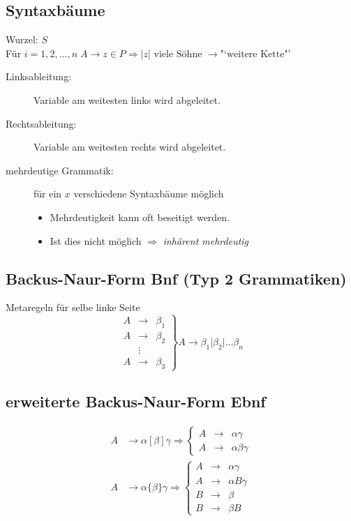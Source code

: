 \documentclass{scrartcl}
\begin{document}
\subsection*{Syntaxbäume}
Wurzel: $S$ \\
Für $i=1,2,\ldots,n\; A\to z\in P\Rightarrow\vert z\vert\textrm{ viele Söhne }\to \textrm{"`weitere Kette"'}$\\
\begin{description}
\item[Linksableitung:] Variable am weitesten links wird abgeleitet.
\item[Rechtsableitung:] Variable am weitesten rechts wird abgeleitet.
\item[mehrdeutige Grammatik:] für ein $x$ verschiedene Syntaxbäume möglich
	\begin{itemize}
	\item Mehrdeutigkeit kann oft beseitigt werden.
	\item Ist dies nicht möglich $\Rightarrow$ \emph{inhärent mehrdeutig}
	\end{itemize}
\end{description}

\subsection*{Backus-Naur-Form Bnf (Typ 2 Grammatiken)}
Metaregeln für selbe linke Seite
\[
\left. \begin{array}{ccc}
A & \to    & \beta_1 \\
A & \to    & \beta_2 \\
  & \vdots &         \\
A & \to    & \beta_3
\end{array} \right\rbrace A\to\beta_1\vert\beta_2\vert\ldots\beta_n
\]

\subsection*{erweiterte Backus-Naur-Form Ebnf}
\begin{align*}
A &\to \alpha[\beta]\gamma \Rightarrow \left\lbrace
\begin{array}{ccc}
A & \to & \alpha\gamma \\
A & \to & \alpha\beta\gamma
\end{array}
\right. \\
A &\to \alpha\{\beta\}\gamma \Rightarrow \left\lbrace
\begin{array}{ccc}
A & \to & \alpha\gamma \\
A & \to & \alpha B\gamma \\
B & \to & \beta \\
B & \to & \beta B
\end{array}
\right.
\end{align*}
\end{document}

